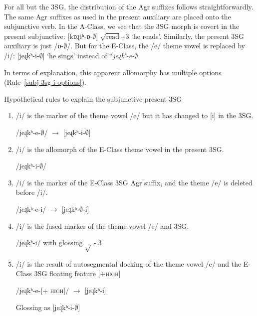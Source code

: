 	
	For all but the 3SG, the distribution of the Agr suffixes follows straightforwardly. The same Agr suffixes as used in the present auxiliary are placed onto the subjunctive verb. In the A-Class, we see that the 3SG morph is covert in the present subjunctive: [{{kɒɻtʰ-ɒ-$\emptyset$}}] $\sqrt{\text{read}}$-{\thgloss}-3{\sg} `he reads'. Similarly, the present 3SG auxiliary is just /{ɒ-$\emptyset$}/. But for the E-Class, the /{e}/ theme vowel is replaced by /i/: {{[jeɻkʰ-i-$\emptyset$}}] `he sings' instead of *\textit{{jeɻkʰ-e-$\emptyset$}}. 

\begin{sloppypar}
In terms of explanation, this apparent allomorphy has multiple options (Rule~\ref{subj 3sg i options}). 
\end{sloppypar}


\begin{newruleblock}
	{Hypothetical rules to explain the subjunctive present 3SG} %

  \begin{enumerate}
     	\item /{i}/ is the marker of the theme vowel /{e}/ but it has changed to [i] in the 3SG.
			
			/{jeɻkʰ-e-$\emptyset$}/ $\rightarrow$ [{jeɻkʰ-i-$\emptyset$}]
			\item /{i}/ is the allomorph of the E-Class theme vowel in the present 3SG.
			
			/{jeɻkʰ-i-$\emptyset$}/ 
					\item /{i}/ is the marker of the E-Class 3SG Agr suffix, and the theme /{e}/ is deleted before /{i}/.
			
			/{jeɻkʰ-e-i}/ $\rightarrow$ [{jeɻkʰ-$\emptyset$-i}]
			\item /{i}/ is the fused marker of the theme vowel /{e}/ and 3SG.
			
			/{jeɻkʰ-i}/ with glossing $\sqrt{~}$-{\thgloss}.3{\sg}
			\item /{i}/ is the result of autosegmental docking of the theme vowel /e/ and the E-Class 3SG floating feature [\textsc{+high}]
			
			/{jeɻkʰ-e}-[+ \textsc{high}]/ $\rightarrow$ [{jeɻkʰ-i}]
			
			Glossing as [jeɻkʰ-i-$\emptyset$]
  \end{enumerate}
		
  
	\end{newruleblock} 

